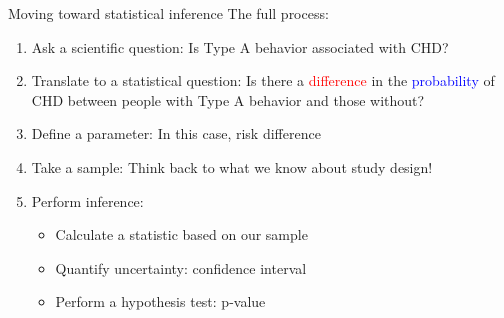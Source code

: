 \documentclass[10pt,t]{beamer}
\begin{document}
\begin{frame}{Moving toward statistical inference}
	The full process:
	\begin{enumerate}
		\item Ask a scientific question: Is Type A behavior associated with CHD? 
		\item Translate to a statistical question: Is there a \textcolor{red}{difference} in the \textcolor{blue}{probability} of CHD between people with Type A behavior and those without?  
		\item Define a parameter: In this case, risk difference  
		\item Take a sample: Think back to what we know about study design!  
		\item Perform inference: 
		\begin{itemize}
			\item Calculate a statistic based on our sample
			\item Quantify uncertainty: confidence interval
			\item Perform a hypothesis test: p-value
		\end{itemize}
	\end{enumerate}
\end{frame}



\end{document}
